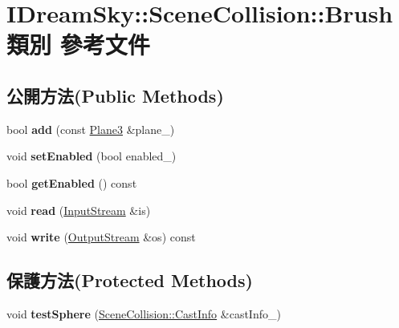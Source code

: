 \hypertarget{class_i_dream_sky_1_1_scene_collision_1_1_brush}{}\section{I\+Dream\+Sky\+:\+:Scene\+Collision\+:\+:Brush 類別 參考文件}
\label{class_i_dream_sky_1_1_scene_collision_1_1_brush}
\subsection*{公開方法(Public Methods)}
\begin{DoxyCompactItemize}
\item 
bool {\bfseries add} (const \hyperlink{class_i_dream_sky_1_1_plane3}{Plane3} \&plane\+\_\+)\hypertarget{class_i_dream_sky_1_1_scene_collision_1_1_brush_ac5871b1a56686de2fd9dc1b57d360d36}{}\label{class_i_dream_sky_1_1_scene_collision_1_1_brush_ac5871b1a56686de2fd9dc1b57d360d36}

\item 
void {\bfseries set\+Enabled} (bool enabled\+\_\+)\hypertarget{class_i_dream_sky_1_1_scene_collision_1_1_brush_a7ac5bc94c0f8540cb107a824597c719b}{}\label{class_i_dream_sky_1_1_scene_collision_1_1_brush_a7ac5bc94c0f8540cb107a824597c719b}

\item 
bool {\bfseries get\+Enabled} () const \hypertarget{class_i_dream_sky_1_1_scene_collision_1_1_brush_aa704b7fb41ae8a626b4d4da4870dcc7a}{}\label{class_i_dream_sky_1_1_scene_collision_1_1_brush_aa704b7fb41ae8a626b4d4da4870dcc7a}

\item 
void {\bfseries read} (\hyperlink{class_i_dream_sky_1_1_input_stream}{Input\+Stream} \&is)\hypertarget{class_i_dream_sky_1_1_scene_collision_1_1_brush_a153f7b5ef193c37343fe714f8ce5c322}{}\label{class_i_dream_sky_1_1_scene_collision_1_1_brush_a153f7b5ef193c37343fe714f8ce5c322}

\item 
void {\bfseries write} (\hyperlink{class_i_dream_sky_1_1_output_stream}{Output\+Stream} \&os) const \hypertarget{class_i_dream_sky_1_1_scene_collision_1_1_brush_abad711d32d17f27f2a4ca526c6e33805}{}\label{class_i_dream_sky_1_1_scene_collision_1_1_brush_abad711d32d17f27f2a4ca526c6e33805}

\end{DoxyCompactItemize}
\subsection*{保護方法(Protected Methods)}
\begin{DoxyCompactItemize}
\item 
void {\bfseries test\+Sphere} (\hyperlink{class_i_dream_sky_1_1_scene_collision_1_1_cast_info}{Scene\+Collision\+::\+Cast\+Info} \&cast\+Info\+\_\+)\hypertarget{class_i_dream_sky_1_1_scene_collision_1_1_brush_a7ff4c1a6f50347ed44f28b4444e26450}{}\label{class_i_dream_sky_1_1_scene_collision_1_1_brush_a7ff4c1a6f50347ed44f28b4444e26450}

\end{DoxyCompactItemize}
